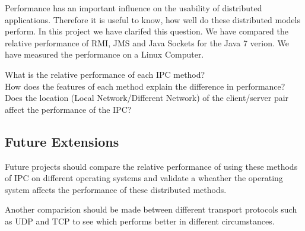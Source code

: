 \documentclass{article}
\begin{document}
Performance has an important influence on the usability of distributed applications. Therefore it is useful to know, how well do these distributed models perform. In this project we have clarifed this question. We have compared the relative performance of RMI, JMS and Java Sockets for the Java 7 verion. We have measured the performance on a Linux Computer.

What is the relative performance of each IPC method?\\


How does the features of each method explain the difference in performance? \\


Does the location (Local Network/Different Network) of the client/server pair affect the performance of the IPC? \\



\subsection{Future Extensions}
Future projects should compare the relative performance of using these methods of IPC on different operating systems and validate a wheather the operating system affects the performance of these distributed methods. 

Another comparision should be made between different transport protocols such as UDP and TCP to see which performs better in different circumstances.







\end{document}
